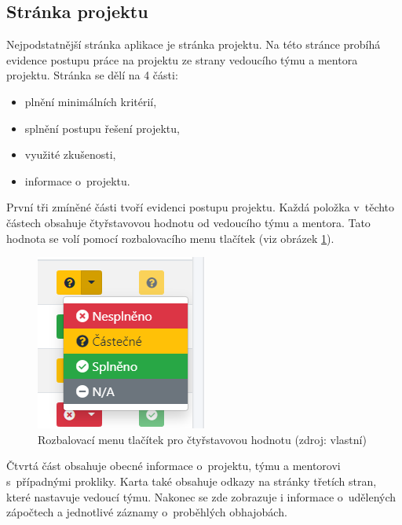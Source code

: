 \documentclass[czech,BP]{thesiskiv}
\begin{document}
	\subsection{Stránka projektu}
	\par Nejpodstatnější stránka aplikace je stránka projektu. Na této stránce probíhá evidence postupu práce na projektu ze strany vedoucího týmu a mentora projektu. Stránka se dělí na 4 části:
	\begin{itemize}
		\item plnění minimálních kritérií,
		\item splnění postupu řešení projektu,
		\item využité zkušenosti,
		\item informace o~projektu.
	\end{itemize}
	\par První tři zmíněné části tvoří evidenci postupu projektu. Každá položka v~těchto částech obsahuje čtyřstavovou hodnotu od vedoucího týmu a mentora. Tato hodnota se volí pomocí rozbalovacího menu tlačítek (viz obrázek \ref{fig:menu_tlacitek}).
	\begin{figure}[H]
		\centering
		\includegraphics{img/ukazky/ctyrstavova_hodnota}
		\caption{Rozbalovací menu tlačítek pro čtyřstavovou hodnotu (zdroj: vlastní)}
		\label{fig:menu_tlacitek}
	\end{figure}
	\par Čtvrtá část obsahuje obecné informace o~projektu, týmu a mentorovi s~případnými prokliky. Karta také obsahuje odkazy na stránky třetích stran, které nastavuje vedoucí týmu. Nakonec se zde zobrazuje i informace o~udělených zápočtech a jednotlivé záznamy o~proběhlých obhajobách.
\end{document}
